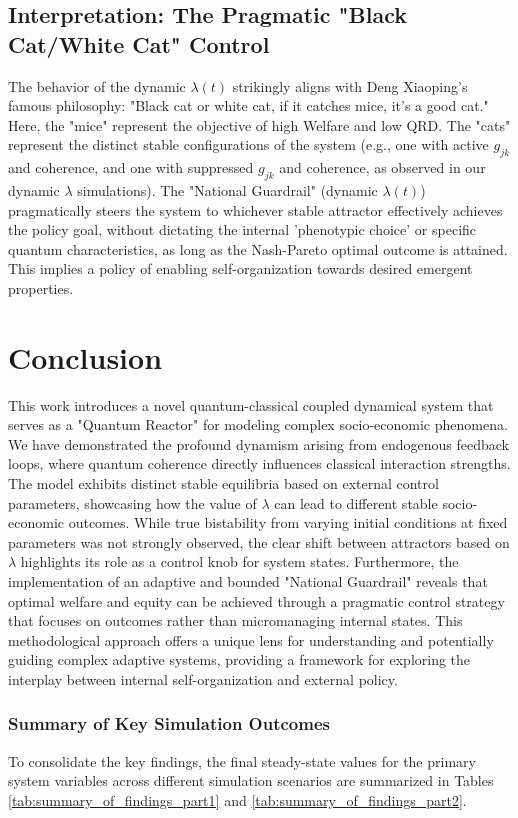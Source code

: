 \documentclass[9pt]{article}
\begin{document}
\subsection{Interpretation: The Pragmatic "Black Cat/White Cat" Control}
The behavior of the dynamic $\lambda(t)$ strikingly aligns with Deng Xiaoping's famous philosophy: "Black cat or white cat, if it catches mice, it's a good cat." Here, the "mice" represent the objective of high Welfare and low QRD. The "cats" represent the distinct stable configurations of the system (e.g., one with active $g_{jk}$ and coherence, and one with suppressed $g_{jk}$ and coherence, as observed in our dynamic $\lambda$ simulations). The "National Guardrail" (dynamic $\lambda(t)$) pragmatically steers the system to whichever stable attractor effectively achieves the policy goal, without dictating the internal 'phenotypic choice' or specific quantum characteristics, as long as the Nash-Pareto optimal outcome is attained. This implies a policy of enabling self-organization towards desired emergent properties.

\section{Conclusion}
This work introduces a novel quantum-classical coupled dynamical system that serves as a "Quantum Reactor" for modeling complex socio-economic phenomena. We have demonstrated the profound dynamism arising from endogenous feedback loops, where quantum coherence directly influences classical interaction strengths. The model exhibits distinct stable equilibria based on external control parameters, showcasing how the value of $\lambda$ can lead to different stable socio-economic outcomes. While true bistability from varying initial conditions at fixed parameters was not strongly observed, the clear shift between attractors based on $\lambda$ highlights its role as a control knob for system states. Furthermore, the implementation of an adaptive and bounded "National Guardrail" reveals that optimal welfare and equity can be achieved through a pragmatic control strategy that focuses on outcomes rather than micromanaging internal states. This methodological approach offers a unique lens for understanding and potentially guiding complex adaptive systems, providing a framework for exploring the interplay between internal self-organization and external policy.

\subsubsection*{Summary of Key Simulation Outcomes}
To consolidate the key findings, the final steady-state values for the primary system variables across different simulation scenarios are summarized in Tables \ref{tab:summary_of_findings_part1} and \ref{tab:summary_of_findings_part2}.
\end{document}
